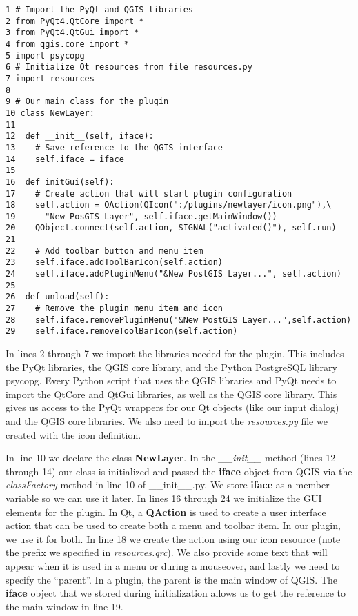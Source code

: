 \begin{verbatim}
1 # Import the PyQt and QGIS libraries
2 from PyQt4.QtCore import *
3 from PyQt4.QtGui import *
4 from qgis.core import *
5 import psycopg
6 # Initialize Qt resources from file resources.py
7 import resources
8
9 # Our main class for the plugin
10 class NewLayer:
11
12  def __init__(self, iface):
13    # Save reference to the QGIS interface
14    self.iface = iface
15
16  def initGui(self):
17    # Create action that will start plugin configuration
18    self.action = QAction(QIcon(":/plugins/newlayer/icon.png"),\
19      "New PosGIS Layer", self.iface.getMainWindow())
20    QObject.connect(self.action, SIGNAL("activated()"), self.run)
21
22    # Add toolbar button and menu item
23    self.iface.addToolBarIcon(self.action)
24    self.iface.addPluginMenu("&New PostGIS Layer...", self.action)
25
26  def unload(self):
27    # Remove the plugin menu item and icon
28    self.iface.removePluginMenu("&New PostGIS Layer...",self.action)
29    self.iface.removeToolBarIcon(self.action)
\end{verbatim}

In lines 2 through 7 we import the libraries needed for the plugin.
This includes the PyQt libraries, the QGIS core library, and the Python PostgreSQL library psycopg.
Every Python script that uses the QGIS libraries and PyQt needs to import the QtCore and QtGui libraries, as well as the QGIS core library.
This gives us access to the PyQt wrappers for our Qt objects (like our input dialog) and the QGIS core libraries.
We also need to import the \textsl{resources.py} file we created with the icon definition.

In line 10 we declare the class \textbf{NewLayer}.
In the \textsl{\_\_init\_\_} method (lines 12 through 14) our class is initialized and passed the \textbf{iface} object from QGIS via the \textsl{classFactory} method in line 10 of \_\_init\_\_.py.
We store \textbf{iface} as a member variable so we can use it later.
In lines 16 through 24 we initialize the GUI elements for the plugin.
In Qt, a \textbf{QAction} is used to create a user interface action that can be used to create both a menu and toolbar item.
In our plugin, we use it for both.
In line 18 we create the action using our icon resource (note the prefix we specified in \textsl{resources.qrc}).
We also provide some text that will appear when it is used in a menu or during a mouseover, and lastly we need to specify the ``parent''.
In a plugin, the parent is the main window of QGIS.
The \textbf{iface} object that we stored during initialization allows us to get the reference to the main window in line 19.

